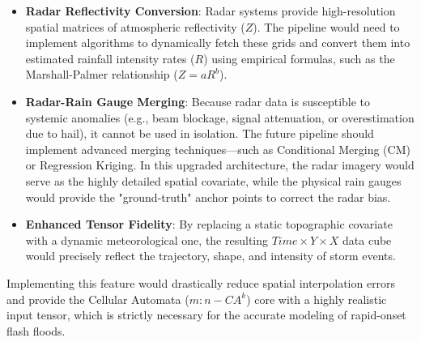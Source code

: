 \begin{itemize}
	\item \textbf{Radar Reflectivity Conversion}: Radar systems provide high-resolution spatial matrices of atmospheric 
	reflectivity ($Z$). The pipeline would need to implement algorithms to dynamically fetch these grids and convert 
	them into estimated rainfall intensity rates ($R$) using empirical formulas, such as the Marshall-Palmer relationship 
	($Z = aR^b$).
	\item \textbf{Radar-Rain Gauge Merging}: Because radar data is susceptible to systemic anomalies (e.g., beam blockage, 
	signal attenuation, or overestimation due to hail), it cannot be used in isolation. The future pipeline should 
	implement advanced merging techniques—such as Conditional Merging (CM) or Regression Kriging. In this upgraded 
	architecture, the radar imagery would serve as the highly detailed spatial covariate, while the physical rain gauges 
	would provide the "ground-truth" anchor points to correct the radar bias.
	\item \textbf{Enhanced Tensor Fidelity}: By replacing a static topographic covariate with a dynamic meteorological 
	one, the resulting $Time \times Y \times X$ data cube would precisely reflect the trajectory, shape, and intensity 
	of storm events.
\end{itemize}

Implementing this feature would drastically reduce spatial interpolation errors and provide the Cellular Automata 
($m:n-CA^k$) core with a highly realistic input tensor, which is strictly necessary for the accurate modeling of 
rapid-onset flash floods.
